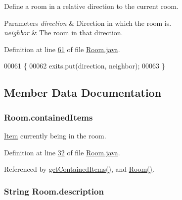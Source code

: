 Define a room in a relative direction to the current room. 


\begin{DoxyParams}{Parameters}
{\em direction} & Direction in which the room is. \\
\hline
{\em neighbor} & The room in that direction. \\
\hline
\end{DoxyParams}


Definition at line \hyperlink{Room_8java_source_l00061}{61} of file \hyperlink{Room_8java_source}{Room.\-java}.


\begin{DoxyCode}
00061                                                          \{
00062         exits.put(direction, neighbor);
00063     \}   
\end{DoxyCode}


\subsection{Member Data Documentation}
\hypertarget{classRoom_a02eea1285ab8d50a2e25cc98d50b185d}{
\subsubsection[{contained\-Items}]{ Room.\-contained\-Items\hspace{0.3cm}{\ttfamily [private]}}}\label{classRoom_a02eea1285ab8d50a2e25cc98d50b185d}


\hyperlink{classItem}{Item} currently being in the room. 



Definition at line \hyperlink{Room_8java_source_l00032}{32} of file \hyperlink{Room_8java_source}{Room.\-java}.



Referenced by \hyperlink{Room_8java_source_l00069}{get\-Contained\-Items()}, and \hyperlink{Room_8java_source_l00049}{Room()}.

\hypertarget{classRoom_a2d7ecf802690a6b13750ca6fa6882d77}{
\subsubsection[{description}]{\setlength{\rightskip}{0pt plus 5cm}String Room.\-description\hspace{0.3cm}{\ttfamily [private]}}}\label{classRoom_a2d7ecf802690a6b13750ca6fa6882d77}



